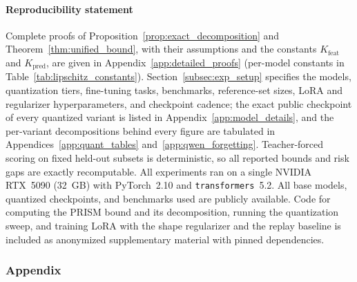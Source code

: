 \documentclass{article} %
\begin{document}
\subsection*{Reproducibility statement}
Complete proofs of Proposition~\ref{prop:exact_decomposition} and
Theorem~\ref{thm:unified_bound}, with their assumptions and the constants
$K_{\mathrm{feat}}$ and $K_{\mathrm{pred}}$, are given in
Appendix~\ref{app:detailed_proofs} (per-model constants in
Table~\ref{tab:lipschitz_constants}). Section~\ref{subsec:exp_setup} specifies
the models, quantization tiers, fine-tuning tasks, benchmarks, reference-set
sizes, LoRA and regularizer hyperparameters, and checkpoint cadence; the exact
public checkpoint of every quantized variant is listed in
Appendix~\ref{app:model_details}, and the per-variant decompositions behind
every figure are tabulated in Appendices~\ref{app:quant_tables}
and~\ref{app:qwen_forgetting}. Teacher-forced scoring on fixed held-out subsets
is deterministic, so all reported bounds and risk gaps are exactly recomputable.
All experiments ran on a single NVIDIA RTX~5090 (32~GB) with PyTorch~2.10 and
\texttt{transformers}~5.2. All base models, quantized checkpoints, and
benchmarks used are publicly available. Code for computing the PRISM bound and
its decomposition, running the quantization sweep, and training LoRA with the
shape regularizer and the replay baseline is included as anonymized
supplementary material with pinned dependencies.


\renewcommand{\bibname}{References}



\clearpage
\appendix
\section*{Appendix}

\vspace{-1.8cm}
\begingroup
\hypersetup{colorlinks=false, linkcolor=black}
\part{} %
\parttoc %
\endgroup










\end{document}
